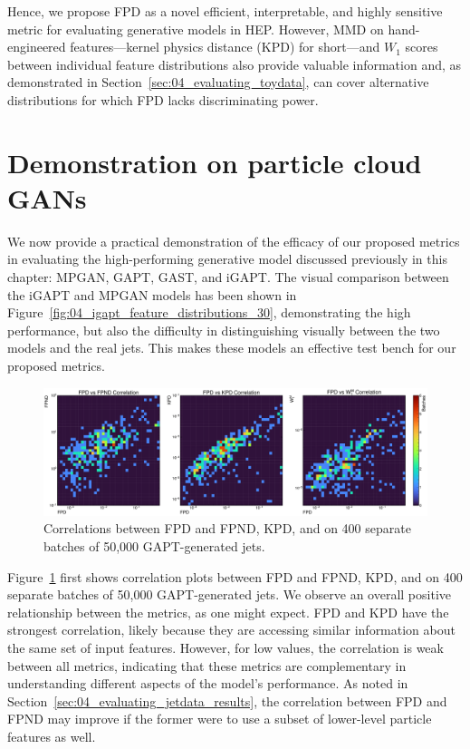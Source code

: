 Hence, we propose FPD as a novel efficient, interpretable, and highly sensitive metric for evaluating generative models in HEP.
However, MMD on hand-engineered features---kernel physics distance (KPD) for short---and $W_1$ scores between individual feature distributions also provide valuable information and, as demonstrated in Section~\ref{sec:04_evaluating_toydata}, can cover alternative distributions for which FPD lacks discriminating power.


\section{Demonstration on particle cloud GANs}
\label{sec:04_evaluating_models}

We now provide a practical demonstration of the efficacy of our proposed metrics in evaluating the high-performing generative model discussed previously in this chapter: MPGAN, GAPT, GAST, and iGAPT.
The visual comparison between the iGAPT and MPGAN models has been shown in Figure~\ref{fig:04_igapt_feature_distributions_30}, demonstrating the high performance, but also the difficulty in distinguishing visually between the two models and the real jets.
This makes these models an effective test bench for our proposed metrics. 


\begin{figure}[ht]
    \includegraphics[width=\textwidth]{figures/04-ML4Sim/evaluating/162_correlations.pdf}
    \caption{Correlations between FPD and FPND, KPD, and \wassm on 400 separate batches of 50,000 GAPT-generated jets.}
    \label{fig:04_evaluating_correlations} 
\end{figure}

Figure~\ref{fig:04_evaluating_correlations} first shows correlation plots between FPD and FPND, KPD, and \wassm on 400 separate batches of 50,000 GAPT-generated jets.
We observe an overall positive relationship between the metrics, as one might expect. 
FPD and KPD have the strongest correlation, likely because they are accessing similar information about the same set of input features.
However, for low values, the correlation is weak between all metrics, indicating that these metrics are complementary in understanding different aspects of the model's performance.
As noted in Section~\ref{sec:04_evaluating_jetdata_results}, the correlation between FPD and FPND may improve if the former were to use a subset of lower-level particle features as well.


